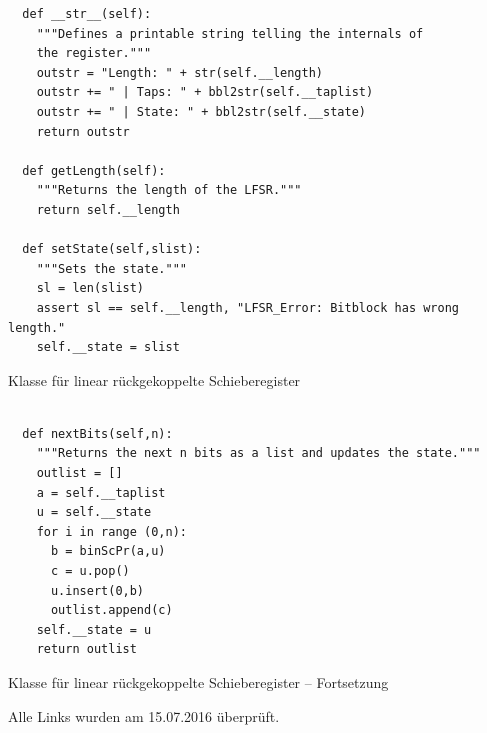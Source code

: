 \begin{refsegment}
\begin{sagecode}
\begin{verbatim}
  def __str__(self):
    """Defines a printable string telling the internals of
    the register."""
    outstr = "Length: " + str(self.__length)
    outstr += " | Taps: " + bbl2str(self.__taplist)
    outstr += " | State: " + bbl2str(self.__state)
    return outstr

  def getLength(self):
    """Returns the length of the LFSR."""
    return self.__length

  def setState(self,slist):
    """Sets the state."""
    sl = len(slist)
    assert sl == self.__length, "LFSR_Error: Bitblock has wrong length."
    self.__state = slist
\end{verbatim}
\caption{Klasse für linear rückgekoppelte
   Schieberegister
   }\label{Sage-code-bool-lfsr3}
\end{sagecode}

\begin{sagecode}
\begin{verbatim}

  def nextBits(self,n):
    """Returns the next n bits as a list and updates the state."""
    outlist = []
    a = self.__taplist
    u = self.__state
    for i in range (0,n):
      b = binScPr(a,u)
      c = u.pop()
      u.insert(0,b)
      outlist.append(c)
    self.__state = u
    return outlist
\end{verbatim}
\caption{Klasse für linear rückgekoppelte
   Schieberegister
   -- Fortsetzung}\label{Sage-code-bool-lfsr4}
\end{sagecode}



\printbibliography[%
	heading=subbibintoc,
	title={Literatur zu Kapitel \thechapter},
	segment=\therefsegment,
]

\noindent Alle Links wurden am 15.07.2016 überprüft.

\end{refsegment}

